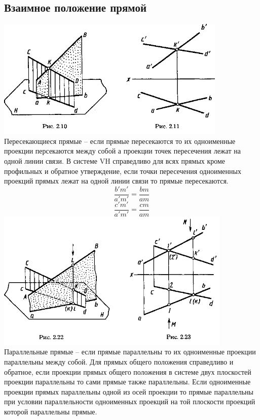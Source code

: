 \documentclass[a4paper, 12pt]{article}
\begin{document}
\subsection{Взаимное положение прямой}
\includegraphics{img/241.png}\\
Пересекающиеся прямые -- если прямые пересекаются то их одноименные проекции персекаются между собой а проекции точек пересечения лежат на одной линии связи. В системе VH справедливо для всях прямых кроме профильных и обратное утверждение, если точки пересечения одноименных проекций прямых лежат на одной линии связи то прямые пересекаются.\\
\[
	\frac{b' m'}{a' m'} = \frac{b m}{a m}	
\]
\[
	\frac{c' m'}{a' m'} = \frac{cm}{am}	
\]
\includegraphics{img/242.png}\\
Параллельные прямые -- если прямые параллельны то их одноименные проекции параллельны между собой. Для прямых общего положения справедливо и обратное, если проекции прямых общего положения в системе двух плоскостей проекции параллельны то сами прямые также параллельны. Если одноименные проекции прямых параллельны одной из осей проекции то прямые параллельны при условии параллельности одноименных проекций на той плоскости проекций которой параллельны прямые.\\
\end{document}
